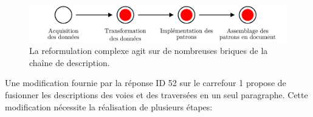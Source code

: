 \begin{figure}
    \centering
    \includegraphics[width=\textwidth]{images/evaluation/pipeline/pipeline_reformulation_complexe.pdf}
    \caption[Reformulation complexe dans la chaîne de description]{La reformulation complexe agit sur de nombreuses briques de la chaîne de description.}
    \label{fig:evaluation_reformulation_complexe}
\end{figure}

\newpar{}

Une modification fournie par la réponse ID 52 sur le carrefour 1 propose de fusionner les descriptions des voies et des traversées en un seul paragraphe. Cette modification nécessite la réalisation de plusieurs étapes:

